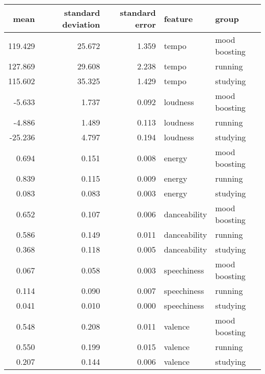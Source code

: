 \begin{tabular}{rrrll}
\toprule
   mean &  standard deviation &  standard error &      feature &         group \\
\midrule
119.429 &              25.672 &           1.359 &        tempo & mood boosting \\
127.869 &              29.608 &           2.238 &        tempo &       running \\
115.602 &              35.325 &           1.429 &        tempo &      studying \\
 -5.633 &               1.737 &           0.092 &     loudness & mood boosting \\
 -4.886 &               1.489 &           0.113 &     loudness &       running \\
-25.236 &               4.797 &           0.194 &     loudness &      studying \\
  0.694 &               0.151 &           0.008 &       energy & mood boosting \\
  0.839 &               0.115 &           0.009 &       energy &       running \\
  0.083 &               0.083 &           0.003 &       energy &      studying \\
  0.652 &               0.107 &           0.006 & danceability & mood boosting \\
  0.586 &               0.149 &           0.011 & danceability &       running \\
  0.368 &               0.118 &           0.005 & danceability &      studying \\
  0.067 &               0.058 &           0.003 &  speechiness & mood boosting \\
  0.114 &               0.090 &           0.007 &  speechiness &       running \\
  0.041 &               0.010 &           0.000 &  speechiness &      studying \\
  0.548 &               0.208 &           0.011 &      valence & mood boosting \\
  0.550 &               0.199 &           0.015 &      valence &       running \\
  0.207 &               0.144 &           0.006 &      valence &      studying \\
\bottomrule
\end{tabular}
